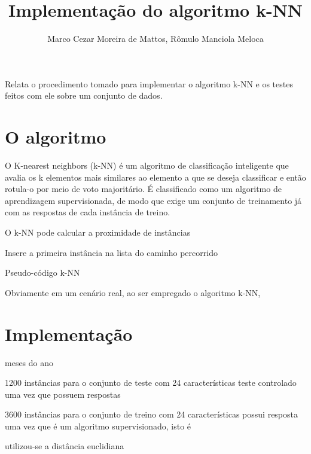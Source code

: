 \documentclass[12pt]{article}
\title{Implementação do algoritmo k-NN}
\author{Marco Cezar Moreira de Mattos\inst{1}, Rômulo Manciola Meloca\inst{1}}
\begin{document}
	\maketitle

	\begin{resumo}
		Relata o procedimento tomado para implementar o algoritmo k-NN e os testes feitos com ele sobre um conjunto de dados.
	\end{resumo}

	\section{O algoritmo}\label{sec:algoritmo}
		
		O K-nearest neighbors (k-NN) é um algoritmo de classificação inteligente que avalia os k elementos mais similares ao elemento a que se deseja classificar e então rotula-o por meio de voto majoritário. É classificado como um algoritmo de aprendizagem supervisionada, de modo que exige um conjunto de treinamento já com as respostas de cada instância de treino.

		O k-NN pode calcular a proximidade de instâncias 

		\begin{algorithm}[H]
			Insere a primeira instância na lista do caminho percorrido\;
			\caption{Pseudo-código k-NN}
		\end{algorithm}

		Obviamente em um cenário real, ao ser empregado o algoritmo k-NN, 

	\section{Implementação}\label{sec:implementacao}


		meses do ano

		1200 instâncias para o conjunto de teste com 24 características
		teste controlado uma vez que possuem respostas

		3600 instâncias para o conjunto de treino com 24 características
		possui resposta uma vez que é um algoritmo supervisionado, isto é

		utilizou-se a distância euclidiana
\end{document}
